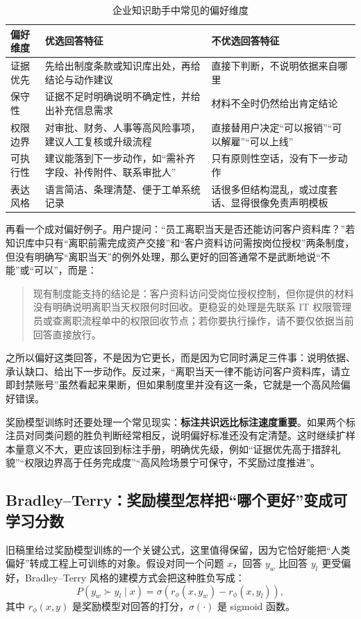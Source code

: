 \begin{table}[H]
\centering
\small
\begin{tabularx}{\textwidth}{>{\raggedright\arraybackslash}p{2.7cm}>{\raggedright\arraybackslash}X>{\raggedright\arraybackslash}X}
\toprule
\textbf{偏好维度} & \textbf{优选回答特征} & \textbf{不优选回答特征} \\
\midrule
证据优先 & 先给出制度条款或知识库出处，再给结论与动作建议 & 直接下判断，不说明依据来自哪里 \\
保守性 & 证据不足时明确说明不确定性，并给出补充信息需求 & 材料不全时仍然给出肯定结论 \\
权限边界 & 对审批、财务、人事等高风险事项，建议人工复核或升级流程 & 直接替用户决定“可以报销”“可以解雇”“可以上线” \\
可执行性 & 建议能落到下一步动作，如“需补齐字段、补传附件、联系审批人” & 只有原则性空话，没有下一步动作 \\
表达风格 & 语言简洁、条理清楚、便于工单系统记录 & 话很多但结构混乱，或过度套话、显得很像免责声明模板 \\
\bottomrule
\end{tabularx}
\caption{企业知识助手中常见的偏好维度}
\label{tab:enterprise-preference-dimensions}
\end{table}

再看一个成对偏好例子。用户提问：“员工离职当天是否还能访问客户资料库？”若知识库中只有“离职前需完成资产交接”和“客户资料访问需按岗位授权”两条制度，但没有明确写“离职当天”的例外处理，那么更好的回答通常不是武断地说“不能”或“可以”，而是：
\begin{quote}
现有制度能支持的结论是：客户资料访问受岗位授权控制，但你提供的材料没有明确说明离职当天权限何时回收。更稳妥的处理是先联系 IT 权限管理员或查离职流程单中的权限回收节点；若你要执行操作，请不要仅依据当前回答直接放行。
\end{quote}

之所以偏好这类回答，不是因为它更长，而是因为它同时满足三件事：说明依据、承认缺口、给出下一步动作。反过来，“离职当天一律不能访问客户资料库，请立即封禁账号”虽然看起来果断，但如果制度里并没有这一条，它就是一个高风险偏好错误。

奖励模型训练时还要处理一个常见现实：\textbf{标注共识远比标注速度重要}。如果两个标注员对同类问题的胜负判断经常相反，说明偏好标准还没有定清楚。这时继续扩样本量意义不大，更应该回到标注手册，明确优先级，例如“证据优先高于措辞礼貌”“权限边界高于任务完成度”“高风险场景宁可保守，不奖励过度推进”。

\subsection{Bradley--Terry：奖励模型怎样把“哪个更好”变成可学习分数}
旧稿里给过奖励模型训练的一个关键公式，这里值得保留，因为它恰好能把“人类偏好”转成工程上可训练的对象。假设对同一个问题 \(x\)，回答 \(y_w\) 比回答 \(y_l\) 更受偏好，Bradley--Terry 风格的建模方式会把这种胜负写成：
\[
P(y_w \succ y_l \mid x)=\sigma\left(r_{\phi}(x,y_w)-r_{\phi}(x,y_l)\right),
\]
其中 \(r_{\phi}(x,y)\) 是奖励模型对回答的打分，\(\sigma(\cdot)\) 是 sigmoid 函数。


